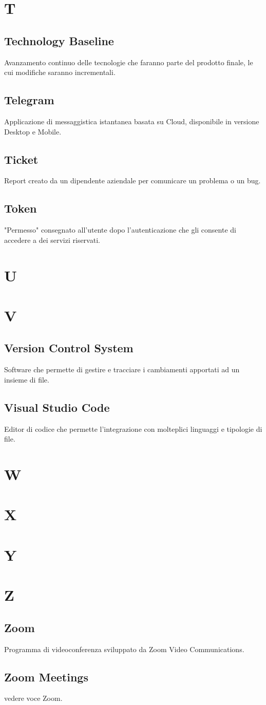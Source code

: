 \section{T}
\subsection{Technology Baseline}
Avanzamento continuo delle tecnologie che faranno parte del prodotto finale, le cui modifiche saranno incrementali.
\subsection{Telegram}
Applicazione di messaggistica istantanea basata su Cloud, disponibile in versione Desktop e Mobile.
\subsection{Ticket}
Report creato da un dipendente aziendale per comunicare un problema o un bug.
\subsection{Token}  
"Permesso" consegnato all'utente dopo l'autenticazione che gli consente di accedere a dei servizi riservati.
\newpage
\section{U}
\section{V}
\subsection{Version Control System}
Software che permette di gestire e tracciare i cambiamenti apportati ad un insieme di file.
\subsection{Visual Studio Code}
Editor di codice che permette l'integrazione con molteplici linguaggi e tipologie di file.
\newpage
\section{W}
\section{X}
\section{Y}
\section{Z}
\subsection{Zoom}
Programma di videoconferenza sviluppato da Zoom Video Communications.
\subsection{Zoom Meetings}
vedere voce Zoom.

